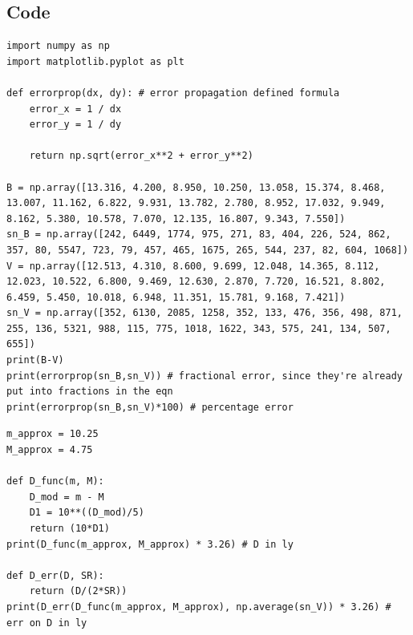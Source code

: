 \documentclass[12pt]{article}
\begin{document}
\subsection*{Code}

%

\begin{minipage}{\linewidth}
\captionsetup{hypcap=false}

\begin{mintedbox}
\begin{verbatim}
import numpy as np
import matplotlib.pyplot as plt

def errorprop(dx, dy): # error propagation defined formula
    error_x = 1 / dx
    error_y = 1 / dy

    return np.sqrt(error_x**2 + error_y**2)

B = np.array([13.316, 4.200, 8.950, 10.250, 13.058, 15.374, 8.468, 13.007, 11.162, 6.822, 9.931, 13.782, 2.780, 8.952, 17.032, 9.949, 8.162, 5.380, 10.578, 7.070, 12.135, 16.807, 9.343, 7.550])
sn_B = np.array([242, 6449, 1774, 975, 271, 83, 404, 226, 524, 862, 357, 80, 5547, 723, 79, 457, 465, 1675, 265, 544, 237, 82, 604, 1068])
V = np.array([12.513, 4.310, 8.600, 9.699, 12.048, 14.365, 8.112, 12.023, 10.522, 6.800, 9.469, 12.630, 2.870, 7.720, 16.521, 8.802, 6.459, 5.450, 10.018, 6.948, 11.351, 15.781, 9.168, 7.421])
sn_V = np.array([352, 6130, 2085, 1258, 352, 133, 476, 356, 498, 871, 255, 136, 5321, 988, 115, 775, 1018, 1622, 343, 575, 241, 134, 507, 655])
print(B-V)
print(errorprop(sn_B,sn_V)) # fractional error, since they're already put into fractions in the eqn
print(errorprop(sn_B,sn_V)*100) # percentage error

\end{verbatim}
\end{mintedbox}

\end{minipage}

\begin{minipage}{\linewidth}
\captionsetup{hypcap=false}

\begin{mintedbox}
\begin{verbatim}
m_approx = 10.25
M_approx = 4.75

def D_func(m, M):
    D_mod = m - M
    D1 = 10**((D_mod)/5)
    return (10*D1)
print(D_func(m_approx, M_approx) * 3.26) # D in ly

def D_err(D, SR):
    return (D/(2*SR))
print(D_err(D_func(m_approx, M_approx), np.average(sn_V)) * 3.26) # err on D in ly

\end{verbatim}
\end{mintedbox}

\end{minipage}
\end{document}
